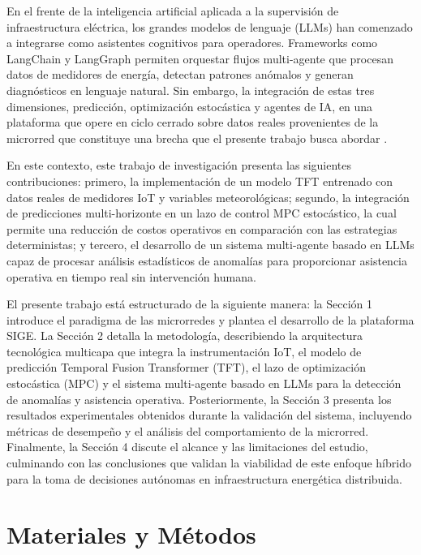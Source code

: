 \documentclass[journal,article,submit,pdftex,moreauthors]{Definitions/mdpi}
\begin{document}
En el frente de la inteligencia artificial aplicada a la supervisi\'on de infraestructura el\'ectrica, los grandes modelos de lenguaje (LLMs) han comenzado a integrarse como asistentes cognitivos para operadores. Frameworks como LangChain \cite{ref-chase} y LangGraph permiten orquestar flujos multi-agente que procesan datos de medidores de energía, detectan patrones an\'omalos y generan diagn\'osticos en lenguaje natural. Sin embargo, la integraci\'on de estas tres dimensiones, predicci\'on, optimizaci\'on estoc\'astica y agentes de IA, en una plataforma que opere en ciclo cerrado sobre datos reales provenientes de la microrred que constituye una brecha que el presente trabajo busca abordar \cite{ref-lami}.

En este contexto, este trabajo de investigación presenta las siguientes contribuciones: primero, la implementación de un modelo TFT entrenado con datos reales de medidores IoT y variables meteorológicas; segundo, la integración de predicciones multi-horizonte en un lazo de control MPC estocástico, la cual permite una reducción de costos operativos en comparación con las estrategias deterministas; y tercero, el desarrollo de un sistema multi-agente basado en LLMs capaz de procesar análisis estadísticos de anomalías para proporcionar asistencia operativa en tiempo real sin intervención humana.

El presente trabajo está estructurado de la siguiente manera: la Sección 1 introduce el paradigma de las microrredes y plantea el desarrollo de la plataforma SIGE. La Sección 2 detalla la metodología, describiendo la arquitectura tecnológica multicapa que integra la instrumentación IoT, el modelo de predicción Temporal Fusion Transformer (TFT), el lazo de optimización estocástica (MPC) y el sistema multi-agente basado en LLMs para la detección de anomalías y asistencia operativa. Posteriormente, la Sección 3 presenta los resultados experimentales obtenidos durante la validación del sistema, incluyendo métricas de desempeño y el análisis del comportamiento de la microrred. Finalmente, la Sección 4 discute el alcance y las limitaciones del estudio, culminando con las conclusiones que validan la viabilidad de este enfoque híbrido para la toma de decisiones autónomas en infraestructura energética distribuida.

\section{Materiales y M\'etodos}
\end{document}

